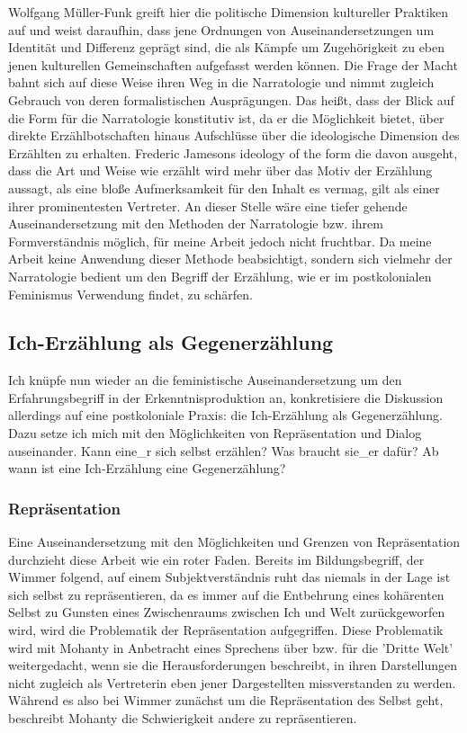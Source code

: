   Wolfgang Müller-Funk greift hier die politische Dimension kultureller
  Praktiken auf und weist daraufhin, dass jene Ordnungen von
  Auseinandersetzungen um Identität und Differenz geprägt sind, die als Kämpfe
  um Zugehörigkeit zu eben jenen kulturellen Gemeinschaften aufgefasst werden
  können. Die Frage der Macht bahnt sich auf diese Weise ihren Weg in die
  Narratologie und nimmt zugleich Gebrauch von deren formalistischen
  Ausprägungen. Das heißt, dass der Blick auf die Form für die Narratologie
  konstitutiv ist, da er die Möglichkeit bietet, über direkte Erzählbotschaften
  hinaus Aufschlüsse über die ideologische Dimension des Erzählten zu erhalten.
  Frederic Jamesons ideology of the form die davon ausgeht, dass die Art und
  Weise wie erzählt wird mehr über das Motiv der Erzählung aussagt, als eine
  bloße Aufmerksamkeit für den Inhalt es vermag, gilt als einer ihrer
  prominentesten Vertreter. An dieser Stelle wäre eine tiefer gehende
  Auseinandersetzung mit den Methoden der Narratologie bzw. ihrem
  Formverständnis möglich, für meine Arbeit jedoch nicht fruchtbar. Da meine
  Arbeit keine Anwendung dieser Methode beabsichtigt, sondern sich vielmehr der
  Narratologie bedient um den Begriff der Erzählung, wie er im postkolonialen
  Feminismus Verwendung findet, zu schärfen.

  \subsection{Ich-Erzählung als Gegenerzählung}

  Ich knüpfe nun wieder an die feministische Auseinandersetzung um den
  Erfahrungsbegriff in der Erkenntnisproduktion an, konkretisiere die
  Diskussion allerdings auf eine postkoloniale Praxis: die Ich-Erzählung als
  Gegenerzählung. Dazu setze ich mich mit den Möglichkeiten von Repräsentation
  und Dialog auseinander. Kann eine\_r sich selbst erzählen? Was braucht sie\_er
  dafür? Ab wann ist eine Ich-Erzählung eine Gegenerzählung?

  \subsubsection{Repräsentation}

  Eine Auseinandersetzung mit den Möglichkeiten und Grenzen von Repräsentation
  durchzieht diese Arbeit wie ein roter Faden. Bereits im Bildungsbegriff, der
  Wimmer folgend, auf einem Subjektverständnis ruht das niemals in der Lage ist
  sich selbst zu repräsentieren, da es immer auf die Entbehrung eines
  kohärenten Selbst zu Gunsten eines Zwischenraums zwischen Ich und Welt
  zurückgeworfen wird, wird die Problematik der Repräsentation aufgegriffen.
  Diese Problematik wird mit  Mohanty in Anbetracht eines Sprechens über bzw.
  für die 'Dritte Welt' weitergedacht, wenn sie die Herausforderungen
  beschreibt, in ihren Darstellungen nicht zugleich als Vertreterin eben jener
  Dargestellten missverstanden zu werden. Während es also bei Wimmer zunächst
  um die Repräsentation des Selbst geht, beschreibt Mohanty die Schwierigkeit
  andere zu repräsentieren.
  
